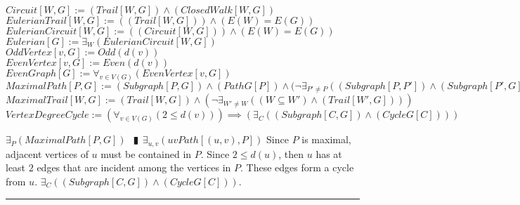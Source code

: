 \documentclass{book}
\newcommand{\abr}{:=}
\newcommand{\pipe}{$\phantom{(}\vrectangleblack\phantom{)}$}
\begin{document}
$Circuit[W, G] \abr (Trail[W, G]) \land (ClosedWalk[W, G])$ \\
$EulerianTrail[W, G] \abr ((Trail[W, G])) \land (E(W) = E(G))$ \\
$EulerianCircuit[W, G] \abr ((Circuit[W, G])) \land (E(W) = E(G))$ \\
$Eulerian[G] \abr \exists_{W}(EulerianCircuit[W, G])$ \\

$OddVertex[v, G] \abr Odd(d(v))$ \\
$EvenVertex[v, G] \abr Even(d(v))$ \\
$EvenGraph[G] \abr \forall_{v \in V(G)}(EvenVertex[v, G])$ \\

$MaximalPath[P, G] \abr (Subgraph[P, G]) \land (PathG[P]) \land (\lnot \exists_{P' \neq P}((Subgraph[P, P']) \land (Subgraph[P', G]) \land (PathG[P']))$ \\
$MaximalTrail[W, G] \abr (Trail[W, G]) \land (\lnot \exists_{W' \neq W}((W \subseteq W') \land (Trail[W', G])))$ \\

$VertexDegreeCycle \abr (\forall_{v \in V(G)}(2 \leq d(v))) \implies (\exists_{C}((Subgraph[C, G]) \land (CycleG[C])))$
\begin{enumerate}
  \lit $\exists_{P}(MaximalPath[P, G])$ \pipe $\exists_{u, v}(uvPath[(u, v), P])$
  \lit Since $P$ is maximal, adjacent vertices of $u$ must be contained in $P$.
  \lit Since $2 \leq d(u)$, then $u$ has at least $2$ edges that are incident among the vertices in $P$.
  \lit These edges form a cycle from $u$. $\exists_{C}((Subgraph[C, G]) \land (CycleG[C]))$.
\end{enumerate} \vspace{.75mm} \hrule \vspace{.75mm} \ \\
\end{document}
